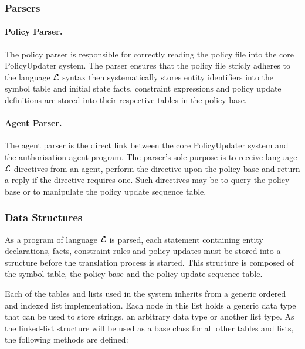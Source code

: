 \documentclass[10pt, twocolumn]{article}
\begin{document}
      \subsubsection{Parsers}

        \paragraph{Policy Parser.}

          The policy parser is responsible for correctly reading the policy
          file into the core PolicyUpdater system. The parser ensures that
          the policy file stricly adheres to the language $\cal{L}$ syntax
          then systematically stores entity identifiers into the symbol table
          and initial state facts, constraint expressions and policy update
          definitions are stored into their respective tables in the policy
          base.

        \paragraph{Agent Parser.}

          The agent parser is the direct link between the core PolicyUpdater
          system and the authorisation agent program. The parser's sole purpose
          is to receive language $\cal{L}$ directives from an agent, perform
          the directive upon the policy base and return a reply if the
          directive requires one. Such directives may be to query the policy
          base or to manipulate the policy update sequence table.

      \subsubsection{Data Structures}

        As a program of language ${\cal L}$ is parsed, each statement
        containing entity declarations, facts, constraint rules and policy
        updates must be stored into a structure before the translation process
        is started. This structure is composed of the symbol table, the policy
        base and the policy update sequence table.

        Each of the tables and lists used in the system inherits from a
        generic ordered and indexed list implementation. Each node in this list
        holds a generic data type that can be used to store strings, an
        arbitrary data type or another list type. As the linked-list structure
        will be used as a base class for all other tables and lists, the
        following methods are defined:
\end{document}

